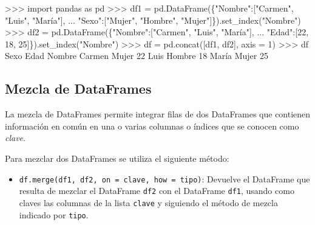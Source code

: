 \documentclass[
  spanish,
  a4paper,
]{scrreport}
\newenvironment{Shaded}{\begin{snugshade}}{\end{snugshade}}
\newcommand{\DecValTok}[1]{\textcolor[rgb]{0.68,0.00,0.00}{#1}}
\newcommand{\ImportTok}[1]{\textcolor[rgb]{0.00,0.46,0.62}{#1}}
\newcommand{\NormalTok}[1]{\textcolor[rgb]{0.00,0.23,0.31}{#1}}
\newcommand{\OperatorTok}[1]{\textcolor[rgb]{0.37,0.37,0.37}{#1}}
\newcommand{\StringTok}[1]{\textcolor[rgb]{0.13,0.47,0.30}{#1}}
\providecommand{\tightlist}{%
  \setlength{\itemsep}{0pt}\setlength{\parskip}{0pt}}
\begin{document}
\begin{Shaded}
\begin{Highlighting}[]
\OperatorTok{\textgreater{}\textgreater{}\textgreater{}} \ImportTok{import}\NormalTok{ pandas }\ImportTok{as}\NormalTok{ pd}
\OperatorTok{\textgreater{}\textgreater{}\textgreater{}}\NormalTok{ df1 }\OperatorTok{=}\NormalTok{ pd.DataFrame(\{}\StringTok{"Nombre"}\NormalTok{:[}\StringTok{"Carmen"}\NormalTok{, }\StringTok{"Luis"}\NormalTok{, }\StringTok{"María"}\NormalTok{], }
\NormalTok{... }\StringTok{"Sexo"}\NormalTok{:[}\StringTok{"Mujer"}\NormalTok{, }\StringTok{"Hombre"}\NormalTok{, }\StringTok{"Mujer"}\NormalTok{]\}).set\_index(}\StringTok{"Nombre"}\NormalTok{)}
\OperatorTok{\textgreater{}\textgreater{}\textgreater{}}\NormalTok{ df2 }\OperatorTok{=}\NormalTok{ pd.DataFrame(\{}\StringTok{"Nombre"}\NormalTok{:[}\StringTok{"Carmen"}\NormalTok{, }\StringTok{"Luis"}\NormalTok{, }\StringTok{"María"}\NormalTok{], }
\NormalTok{... }\StringTok{"Edad"}\NormalTok{:[}\DecValTok{22}\NormalTok{, }\DecValTok{18}\NormalTok{, }\DecValTok{25}\NormalTok{]\}).set\_index(}\StringTok{"Nombre"}\NormalTok{)}
\OperatorTok{\textgreater{}\textgreater{}\textgreater{}}\NormalTok{ df }\OperatorTok{=}\NormalTok{ pd.concat([df1, df2], axis }\OperatorTok{=} \DecValTok{1}\NormalTok{)}
\OperatorTok{\textgreater{}\textgreater{}\textgreater{}}\NormalTok{ df}
\NormalTok{          Sexo  Edad}
\NormalTok{Nombre              }
\NormalTok{Carmen   Mujer    }\DecValTok{22}
\NormalTok{Luis    Hombre    }\DecValTok{18}
\NormalTok{María    Mujer    }\DecValTok{25}
\end{Highlighting}
\end{Shaded}

\subsection{Mezcla de DataFrames}\label{mezcla-de-dataframes}

La mezcla de DataFrames permite integrar filas de dos DataFrames que
contienen información en común en una o varias columnas o índices que se
conocen como \emph{clave}.

Para mezclar dos DataFrames se utiliza el siguiente método:

\begin{itemize}
\tightlist
\item
  \texttt{df.merge(df1,\ df2,\ on\ =\ clave,\ how\ =\ tipo)}: Devuelve
  el DataFrame que resulta de mezclar el DataFrame \texttt{df2} con el
  DataFrame \texttt{df1}, usando como claves las columnas de la lista
  \texttt{clave} y siguiendo el método de mezcla indicado por
  \texttt{tipo}.
\end{itemize}
\end{document}
